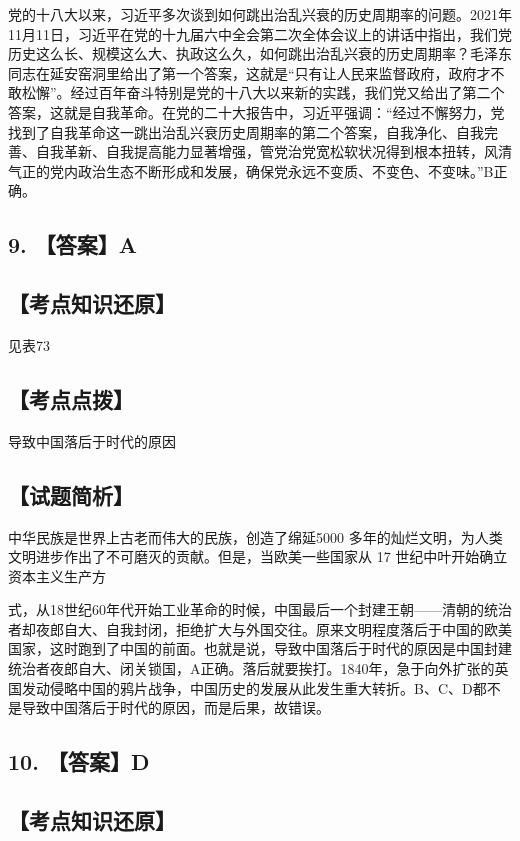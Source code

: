 \documentclass[UTF8,11pt]{ctexart}
\begin{document}
党的十八大以来，习近平多次谈到如何跳出治乱兴衰的历史周期率的问题。2021年11月11日，习近平在党的十九届六中全会第二次全体会议上的讲话中指出，我们党历史这么长、规模这么大、执政这么久，如何跳出治乱兴衰的历史周期率？毛泽东同志在延安窑洞里给出了第一个答案，这就是“只有让人民来监督政府，政府才不敢松懈”。经过百年奋斗特别是党的十八大以来新的实践，我们党又给出了第二个答案，这就是自我革命。在党的二十大报告中，习近平强调：“经过不懈努力，党找到了自我革命这一跳出治乱兴衰历史周期率的第二个答案，自我净化、自我完善、自我革新、自我提高能力显著增强，管党治党宽松软状况得到根本扭转，风清气正的党内政治生态不断形成和发展，确保党永远不变质、不变色、不变味。”B正确。


\subsection*{9. 【答案】A}

\subsection*{【考点知识还原】}

见表73


\subsection*{【考点点拨】}

导致中国落后于时代的原因


\subsection*{【试题简析】}

中华民族是世界上古老而伟大的民族，创造了绵延5000 多年的灿烂文明，为人类文明进步作出了不可磨灭的贡献。但是，当欧美一些国家从 17 世纪中叶开始确立资本主义生产方


式，从18世纪60年代开始工业革命的时候，中国最后一个封建王朝——清朝的统治者却夜郎自大、自我封闭，拒绝扩大与外国交往。原来文明程度落后于中国的欧美国家，这时跑到了中国的前面。也就是说，导致中国落后于时代的原因是中国封建统治者夜郎自大、闭关锁国，A正确。落后就要挨打。1840年，急于向外扩张的英国发动侵略中国的鸦片战争，中国历史的发展从此发生重大转折。B、C、D都不是导致中国落后于时代的原因，而是后果，故错误。


\subsection*{10. 【答案】D}

\subsection*{【考点知识还原】}
\end{document}
